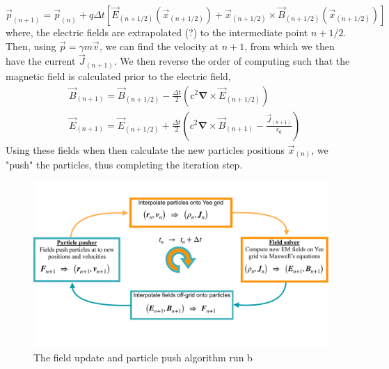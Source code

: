 \begin{equation}
\vec{p}_{(n+1)}=\vec{p}_{(n)}+q\Delta t\left[\vec{E}_{(n+1/2)}\left(\vec{x}_{(n+1/2)}\right)+\vec{x}_{(n+1/2)}\times\vec{B}_{(n+1/2)}\left(\vec{x}_{(n+1/2)}\right) \right]
\end{equation}
where, the electric fields are extrapolated (?) to the intermediate point $n+1/2$. Then, using $\vec{p}=\gamma m \vec{v}$, we can find the velocity at $n+1$, from which we then have the current $\vec{J}_{(n+1)}$. We then reverse the order of computing such that the magnetic field is calculated prior to the electric field,
\begin{align}
&\vec{B}_{(n+1)}=\vec{B}_{(n+1/2)}-\frac{\Delta t}{2}\left(c^2\mathbf{\nabla}\times \vec{E}_{(n+1/2)}\right)\\
&\vec{E}_{(n+1)}=\vec{E}_{(n+1/2)}+\frac{\Delta t}{2}\left(c^2\mathbf{\nabla}\times \vec{B}_{(n+1)}-\frac{\vec{J}_{(n+1)}}{\epsilon_0}\right)
\end{align}
Using these fields when then calculate the new particles positions $\vec{x}_{(n)}$, we "push" the particles, thus completing the iteration step.
\begin{figure}
\includegraphics[width=\textwidth]{PIC_loop2.pdf}
\caption{The field update and particle push algorithm run b}
\end{figure}


